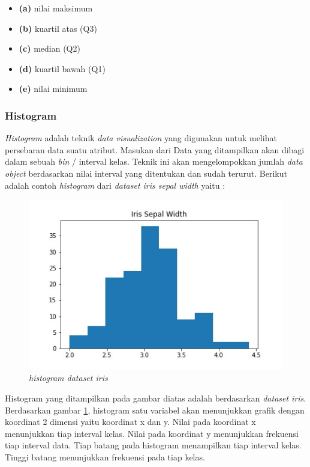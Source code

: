 \documentclass[a4paper,twoside]{article}
\begin{document}
\begin{enumerate}
	 	
	 	\begin{itemize}
	 	\item \textbf{(a)} nilai maksimum 
	 	\item \textbf{(b)} kuartil atas (Q3) 
	 	\item \textbf{(c)} median (Q2) 
	 	\item \textbf{(d)} kuartil bawah (Q1)
	 	\item \textbf{(e)} nilai minimum 
	 	\end{itemize}
\pagebreak 	
	 	\subsubsection{\textbf{Histogram}} 
 \textit{Histogram} adalah teknik \textit{data visualization} yang digunakan untuk melihat persebaran data suatu atribut. Masukan dari  Data yang ditampilkan akan dibagi dalam sebuah \textit{bin} / interval kelas. Teknik ini akan mengelompokkan jumlah \textit{data object} berdasarkan nilai interval yang ditentukan dan sudah terurut. Berikut adalah contoh \textit{histogram} dari \textit{dataset iris sepal width} yaitu :
	 	
	 	   	
			\begin{figure}[h!]
	\centering  
	\includegraphics[scale=0.7]{histogramiris}   
	\caption{\textit{ histogram dataset iris}}
	\label{fig:histogram} 
\end{figure} 
	
	
 Histogram yang ditampilkan pada gambar diatas adalah berdasarkan \textit{dataset iris}. Berdasarkan gambar \ref{fig:histogram}, histogram satu variabel akan menunjukkan grafik dengan koordinat 2 dimensi yaitu koordinat x dan y. Nilai pada koordinat x menunjukkan tiap interval kelas. Nilai pada koordinat y menunjukkan frekuensi tiap interval data. Tiap batang pada histogram menampilkan tiap interval kelas. Tinggi batang menunjukkan frekuensi pada tiap kelas.
		

\end{enumerate}
\end{document}
